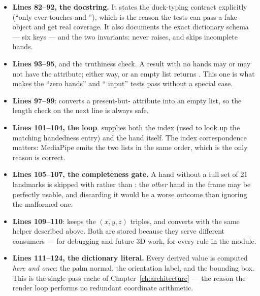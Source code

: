 \begin{itemize}
  \item \textbf{Lines 82--92, the docstring.} It states the duck-typing contract explicitly
        (``only ever touches  and ''), which is
        the reason the tests can pass a fake object and get real coverage. It also documents the
        exact dictionary schema --- six keys --- and the two invariants: never raises, and skips
        incomplete hands.
  \item \textbf{Lines 93--95},  and the
        truthiness check. A result with no hands may or may not have the attribute; either way,
         or an empty list returns \code{[]}. This one  is what makes the
        ``zero hands'' and `` input'' tests pass without a special case.
  \item \textbf{Lines 97--99}:  converts a present-but- attribute into an
        empty list, so the length check on the next line is always safe.
  \item \textbf{Lines 101--104, the loop}.  supplies both the index (used to look up
        the matching handedness entry) and the hand itself. The index correspondence matters:
        MediaPipe emits the two lists in the same order, which is the only reason
         is correct.
  \item \textbf{Lines 105--107, the completeness gate.} A hand without a full set of 21 landmarks is
        skipped with  rather than : the \emph{other} hand in the frame may
        be perfectly usable, and discarding it would be a worse outcome than ignoring the malformed
        one.
  \item \textbf{Lines 109--110}:  keeps the $(x, y, z)$ triples, and  converts
        with the same helper described above. Both are stored because they serve different consumers
        ---  for debugging and future 3D work,  for every rule in the module.
  \item \textbf{Lines 111--124, the dictionary literal.} Every derived value is computed \emph{here
        and once}: the palm normal, the orientation label, and the bounding box. This is the
        single-pass cache of Chapter~\ref{ch:architecture} --- the reason the render loop performs no
        redundant coordinate arithmetic.
\end{itemize}

